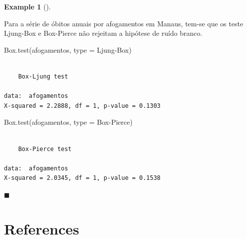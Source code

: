 \documentclass[
  letterpaper,
  DIV=11,
  numbers=noendperiod]{scrreprt}
\newenvironment{Shaded}{\begin{snugshade}}{\end{snugshade}}
\newcommand{\AttributeTok}[1]{\textcolor[rgb]{0.40,0.45,0.13}{#1}}
\newcommand{\FunctionTok}[1]{\textcolor[rgb]{0.28,0.35,0.67}{#1}}
\newcommand{\NormalTok}[1]{\textcolor[rgb]{0.00,0.23,0.31}{#1}}
\newcommand{\StringTok}[1]{\textcolor[rgb]{0.13,0.47,0.30}{#1}}
\newlength{\cslhangindent}
\newlength{\cslentryspacingunit} %
\newenvironment{CSLReferences}[2] %
 {%
  \setlength{\parindent}{0pt}
  \ifodd #1
  \let\oldpar\par
  \def\par{\hangindent=\cslhangindent\oldpar}
  \fi
  \setlength{\parskip}{#2\cslentryspacingunit}
 }%
 {}
\theoremstyle{definition}
\theoremstyle{plain}
\theoremstyle{definition}
\newtheorem{example}{Example}[chapter]
\theoremstyle{remark}
\begin{document}
\begin{example}[]\protect\hypertarget{exm-afogamentos_testes}{}\label{exm-afogamentos_testes}

Para a série de óbitos anuais por afogamentos em Manaus, tem-se que os
teste Ljung-Box e Box-Pierce não rejeitam a hipótese de ruído branco.

\begin{Shaded}
\begin{Highlighting}[]
\FunctionTok{Box.test}\NormalTok{(afogamentos, }\AttributeTok{type =} \StringTok{\textquotesingle{}Ljung{-}Box\textquotesingle{}}\NormalTok{)}
\end{Highlighting}
\end{Shaded}

\begin{verbatim}

    Box-Ljung test

data:  afogamentos
X-squared = 2.2888, df = 1, p-value = 0.1303
\end{verbatim}

\begin{Shaded}
\begin{Highlighting}[]
\FunctionTok{Box.test}\NormalTok{(afogamentos, }\AttributeTok{type =} \StringTok{\textquotesingle{}Box{-}Pierce\textquotesingle{}}\NormalTok{)}
\end{Highlighting}
\end{Shaded}

\begin{verbatim}

    Box-Pierce test

data:  afogamentos
X-squared = 2.0345, df = 1, p-value = 0.1538
\end{verbatim}

\(\blacksquare\)

\end{example}


\hypertarget{references}{%
\chapter*{References}\label{references}}


\hypertarget{refs}{}
\begin{CSLReferences}{0}{0}
\end{CSLReferences}
\end{document}
